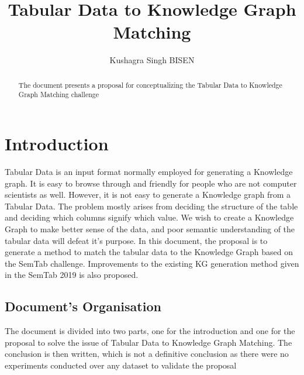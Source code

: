 \documentclass[runningheads]{llncs}
\begin{document}
%
\title{Tabular Data to Knowledge Graph Matching}
%
%
\author{Kushagra Singh BISEN}
%
%
%
\maketitle              %
%
\begin{abstract}
    The document presents a proposal for conceptualizing the Tabular Data to Knowledge Graph Matching challenge
    
\end{abstract}


\section{Introduction}

Tabular Data is an input format normally employed for generating a Knowledge graph. It is easy to browse through and friendly for people who are not computer scientists 
as well. However, it is not easy to generate a Knowledge graph from a Tabular Data. The problem mostly arises from deciding the structure of the table and
deciding which columns signify which value. We wish to create a Knowledge Graph to make better sense of the data, and poor semantic understanding of the tabular
data will defeat it's purpose. In this document, the proposal is to generate a method to match the tabular data to the Knowledge Graph based on the SemTab 
challenge. Improvements to the existing KG generation method given in the SemTab 2019 is also proposed.

\subsection{Document's Organisation}
The document is divided into two parts, one for the introduction and one for the proposal to solve the issue of Tabular Data to Knowledge Graph Matching. The 
conclusion is then written, which is not a definitive conclusion as there were no experiments conducted over any dataset to validate the proposal
\end{document}
